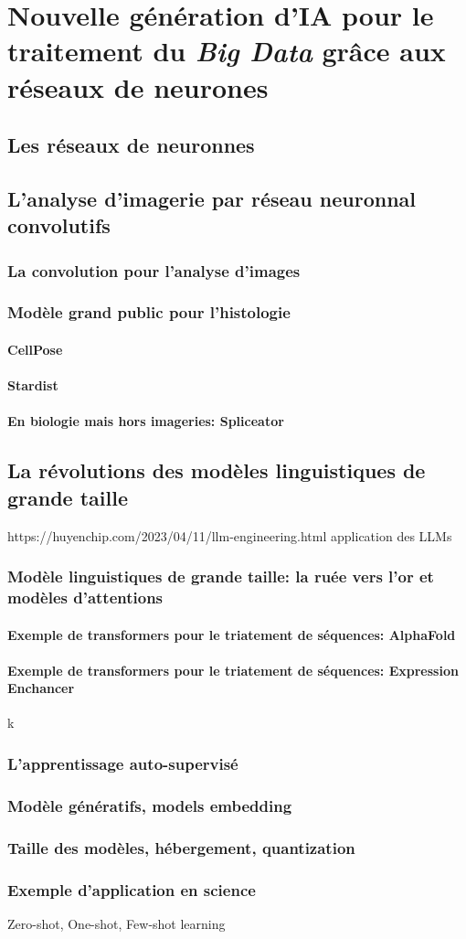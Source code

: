 \chapter{Nouvelle génération d’IA pour le traitement du \textit{Big Data} grâce aux réseaux de neurones}
\section{Les réseaux de neuronnes}
\section{L'analyse d'imagerie par  réseau neuronnal convolutifs}
\subsection{La convolution pour l'analyse d'images}
\subsection{Modèle grand public pour l'histologie}
\subsubsection{CellPose}
\subsubsection{Stardist}
\subsubsection{En biologie mais hors imageries: Spliceator}
\section{La révolutions des modèles linguistiques de grande taille}
https://huyenchip.com/2023/04/11/llm-engineering.html application des LLMs
\subsection{Modèle linguistiques de grande taille: la ruée vers l'or et modèles d'attentions}
\subsubsection{Exemple de transformers pour le triatement de séquences: AlphaFold}
\subsubsection{Exemple de transformers pour le triatement de séquences: Expression Enchancer}k
\subsection{L'apprentissage auto-supervisé}
\subsection{Modèle génératifs, models embedding}
\subsection{Taille des modèles, hébergement, quantization}
\subsection{Exemple d'application en science}

Zero-shot, One-shot, Few-shot learning